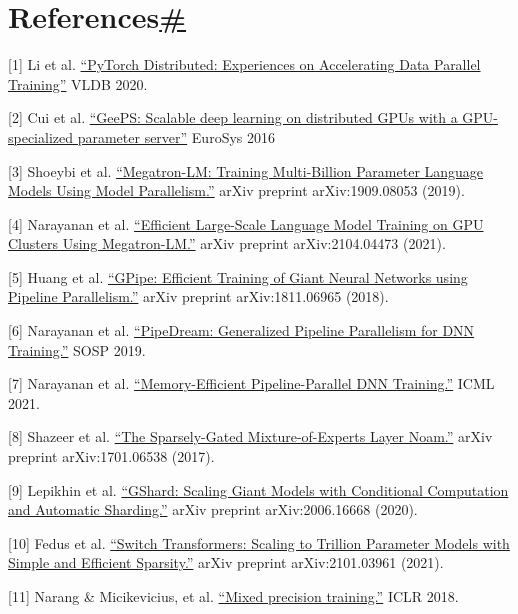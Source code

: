 \section{\texorpdfstring{References\hyperref[references]{\#}}{References\#}}\label{references}

{[}1{]} Li et al. \href{https://arxiv.org/abs/2006.15704}{``PyTorch Distributed: Experiences on Accelerating Data Parallel Training''} VLDB 2020.

{[}2{]} Cui et al. \href{https://www.pdl.cmu.edu/PDL-FTP/CloudComputing/GeePS-cui-eurosys16.pdf}{``GeePS: Scalable deep learning on distributed GPUs with a GPU-specialized parameter server''} EuroSys 2016

{[}3{]} Shoeybi et al. \href{https://arxiv.org/abs/1909.08053}{``Megatron-LM: Training Multi-Billion Parameter Language Models Using Model Parallelism.''} arXiv preprint arXiv:1909.08053 (2019).

{[}4{]} Narayanan et al. \href{https://arxiv.org/abs/2104.04473}{``Efficient Large-Scale Language Model Training on GPU Clusters Using Megatron-LM.''} arXiv preprint arXiv:2104.04473 (2021).

{[}5{]} Huang et al. \href{https://arxiv.org/abs/1811.06965}{``GPipe: Efficient Training of Giant Neural Networks using Pipeline Parallelism.''} arXiv preprint arXiv:1811.06965 (2018).

{[}6{]} Narayanan et al. \href{https://cs.stanford.edu/~matei/papers/2019/sosp_pipedream.pdf}{``PipeDream: Generalized Pipeline Parallelism for DNN Training.''} SOSP 2019.

{[}7{]} Narayanan et al. \href{https://arxiv.org/abs/2006.09503}{``Memory-Efficient Pipeline-Parallel DNN Training.''} ICML 2021.

{[}8{]} Shazeer et al. \href{https://arxiv.org/abs/1701.06538}{``The Sparsely-Gated Mixture-of-Experts Layer Noam.''} arXiv preprint arXiv:1701.06538 (2017).

{[}9{]} Lepikhin et al. \href{https://arxiv.org/abs/2006.16668}{``GShard: Scaling Giant Models with Conditional Computation and Automatic Sharding.''} arXiv preprint arXiv:2006.16668 (2020).

{[}10{]} Fedus et al. \href{https://arxiv.org/abs/2101.03961}{``Switch Transformers: Scaling to Trillion Parameter Models with Simple and Efficient Sparsity.''} arXiv preprint arXiv:2101.03961 (2021).

{[}11{]} Narang \& Micikevicius, et al. \href{https://arxiv.org/abs/1710.03740}{``Mixed precision training.''} ICLR 2018.

